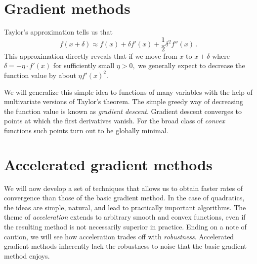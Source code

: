 \documentclass[12pt]{article}
\begin{document}
\maketitle



\pagebreak

\setcounter{tocdepth}{2}
\tableofcontents

\pagebreak



\pagebreak
\part{Gradient methods}
\label{part:basic}

Taylor's approximation tells us that
\[
f(x+\delta)\approx f(x) + \delta f'(x) + \frac 12 \delta^2 f''(x)\,.
\]
This approximation directly reveals that if we move from $x$ to $x+\delta$ where
$\delta=-\eta \cdot f'(x)$ for sufficiently small $\eta>0,$ we generally expect
to decrease the function value by about $\eta f'(x)^2.$ 

We will generalize this simple idea to functions of many variables with the help
of multivariate versions of Taylor's theorem. The simple greedy way of
decreasing the function value is known as \emph{gradient descent}. Gradient
descent converges to points at which the first derivatives vanish. For the broad
class of \emph{convex} functions such points turn out to be globally minimal.







\pagebreak
\part{Accelerated gradient methods}
\label{part:accelerated}

We will now develop a set of techniques that allows us to obtain faster rates of
convergence than those of the basic gradient method. In the case of quadratics,
the ideas are simple, natural, and lead to practically important algorithms. The
theme of \emph{acceleration} extends to arbitrary smooth and convex functions,
even if the resulting method is not necessarily superior in practice.  Ending on
a note of caution, we will see how acceleration trades off with
\emph{robustness}. Accelerated gradient methods inherently lack the robustness
to noise that the basic gradient method enjoys.
\end{document}
